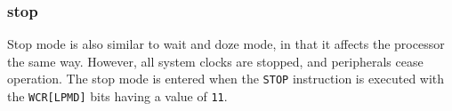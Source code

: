 \subsubsection*{stop}
Stop mode is also similar to wait and doze mode, in that it affects the
processor the same way. However, all system clocks are stopped, and peripherals
cease operation.
The stop mode is entered when the \texttt{STOP} instruction is executed with the
\texttt{WCR[LPMD]} bits having a value of \texttt{11}.

